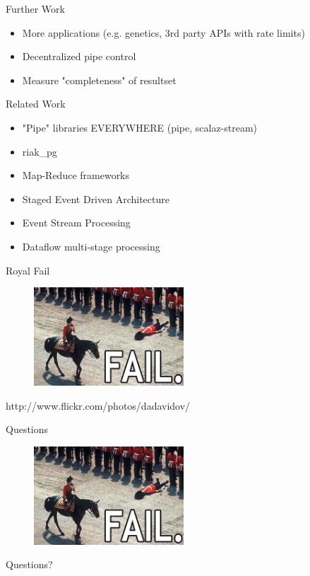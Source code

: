 \documentclass[compress]{beamer}
\begin{document}
\begin{frame}{Further Work}
  \begin{itemize}
    \item More applications (e.g. genetics, 3rd party APIs with rate limits)
    \item Decentralized pipe control
    \item Measure "completeness" of resultset
  \end{itemize}
\end{frame}

\begin{frame}{Related Work}
  \begin{itemize}
    \item "Pipe" libraries EVERYWHERE (pipe, scalaz-stream)
    \item riak\_pg
    \item Map-Reduce frameworks
    \item Staged Event Driven Architecture
    \item Event Stream Processing
    \item Dataflow multi-stage processing
  \end{itemize}
\end{frame}

\begin{frame}{Royal Fail}
  \begin{figure}
    \centering
    \includegraphics[width=0.5\textwidth]{assets/royal_fail.jpg}
  \end{figure}
  \small{http://www.flickr.com/photos/dadavidov/}
\end{frame}

\begin{frame}{Questions}
  \begin{figure}
    \centering
    \includegraphics[width=0.5\textwidth]{assets/royal_fail.jpg}
  \end{figure}
  \Large{Questions?}
\end{frame}
\end{document}
